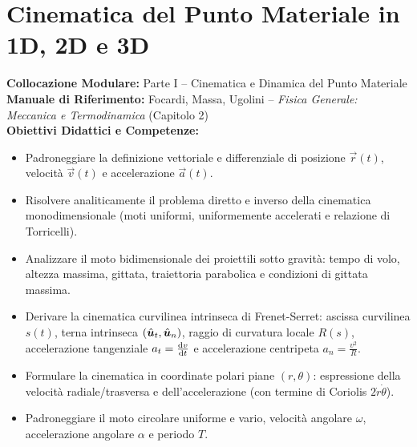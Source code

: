 \chapter{Cinematica del Punto Materiale in 1D, 2D e 3D}
\label{chap:cinematica_punto}

\begin{tcolorbox}[enhanced, breakable, colback=navyblue!4!white, colframe=navyblue!80!black,
    coltitle=white, fonttitle=\bfseries\sffamily, title={Quadro Sinottico del Capitolo 02},
    sharp corners, rounded corners=south, boxrule=1pt]
\textbf{Collocazione Modulare:} Parte I -- Cinematica e Dinamica del Punto Materiale\\
\textbf{Manuale di Riferimento:} Focardi, Massa, Ugolini -- \emph{Fisica Generale: Meccanica e Termodinamica} (Capitolo 2)\\
\textbf{Obiettivi Didattici e Competenze:}\par
\begin{itemize}
    \item Padroneggiare la definizione vettoriale e differenziale di posizione $\vec{r}(t)$, velocità $\vec{v}(t)$ e accelerazione $\vec{a}(t)$.
    \item Risolvere analiticamente il problema diretto e inverso della cinematica monodimensionale (moti uniformi, uniformemente accelerati e relazione di Torricelli).
    \item Analizzare il moto bidimensionale dei proiettili sotto gravità: tempo di volo, altezza massima, gittata, traiettoria parabolica e condizioni di gittata massima.
    \item Derivare la cinematica curvilinea intrinseca di Frenet-Serret: ascissa curvilinea $s(t)$, terna intrinseca $(\hat{\bm{u}}_t, \hat{\bm{u}}_n)$, raggio di curvatura locale $R(s)$, accelerazione tangenziale $a_t = \frac{\mathrm{d} v}{\mathrm{d} t}$ e accelerazione centripeta $a_n = \frac{v^2}{R}$.
    \item Formulare la cinematica in coordinate polari piane $(r, \theta)$: espressione della velocità radiale/trasversa e dell'accelerazione (con termine di Coriolis $2\dot{r}\dot{\theta}$).
    \item Padroneggiare il moto circolare uniforme e vario, velocità angolare $\omega$, accelerazione angolare $\alpha$ e periodo $T$.
\end{itemize}
\end{tcolorbox}

